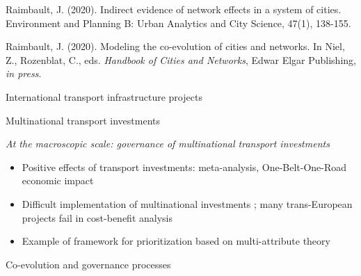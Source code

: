 \documentclass[12pt]{iopart}
\begin{document}
\nocite{raimbault2018indirect}
\nocite{raimbault2020modeling}


Raimbault, J. (2020). Indirect evidence of network effects in a system of cities. Environment and Planning B: Urban Analytics and City Science, 47(1), 138-155.


Raimbault, J. (2020). Modeling the co-evolution of cities and networks. In Niel, Z., Rozenblat, C., eds. \textit{Handbook of Cities and Networks}, Edwar Elgar Publishing, \textit{in press}.






International transport infrastructure projects



\cite{khan2014constructive}


\cite{gibb1992channel}



\cite{yang2006geopolitics}



\cite{marincioni2009lyon}







Multinational transport investments

\textit{At the macroscopic scale: governance of multinational transport investments}


\begin{itemize}
	\item Positive effects of transport investments: \cite{melo2013productivity} meta-analysis, \cite{yii2018transportation} One-Belt-One-Road economic impact
	\item Difficult implementation of multinational investments \cite{tsamboulas1984multinational}; many trans-European projects fail in cost-benefit analysis \cite{proost2014selected} 
	\item Example of framework for prioritization based on multi-attribute theory \cite{tsamboulas2007tool}
\end{itemize}



Co-evolution and governance processes
\end{document}
